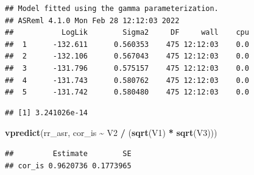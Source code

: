 \documentclass[
  12pt,
]{book}
\newenvironment{Shaded}{\begin{snugshade}}{\end{snugshade}}
\newcommand{\DataTypeTok}[1]{\textcolor[rgb]{0.13,0.29,0.53}{#1}}
\newcommand{\DecValTok}[1]{\textcolor[rgb]{0.00,0.00,0.81}{#1}}
\newcommand{\KeywordTok}[1]{\textcolor[rgb]{0.13,0.29,0.53}{\textbf{#1}}}
\newcommand{\NormalTok}[1]{#1}
\newcommand{\OperatorTok}[1]{\textcolor[rgb]{0.81,0.36,0.00}{\textbf{#1}}}
\newcommand{\OtherTok}[1]{\textcolor[rgb]{0.56,0.35,0.01}{#1}}
\newcommand{\StringTok}[1]{\textcolor[rgb]{0.31,0.60,0.02}{#1}}
\begin{document}
\begin{verbatim}
## Model fitted using the gamma parameterization.
## ASReml 4.1.0 Mon Feb 28 12:12:03 2022
##           LogLik        Sigma2     DF     wall    cpu
##  1      -132.611      0.560353    475 12:12:03    0.0
##  2      -132.106      0.567043    475 12:12:03    0.0
##  3      -131.796      0.575157    475 12:12:03    0.0
##  4      -131.743      0.580762    475 12:12:03    0.0
##  5      -131.742      0.580480    475 12:12:03    0.0
\end{verbatim}

\begin{Shaded}
\end{Shaded}

\begin{verbatim}
## [1] 3.241026e-14
\end{verbatim}

\begin{Shaded}
\begin{Highlighting}[]
\KeywordTok{vpredict}\NormalTok{(rr\_asr, cor\_is }\OperatorTok{\textasciitilde{}}\StringTok{ }\NormalTok{V2 }\OperatorTok{/}\StringTok{ }\NormalTok{(}\KeywordTok{sqrt}\NormalTok{(V1) }\OperatorTok{*}\StringTok{ }\KeywordTok{sqrt}\NormalTok{(V3)))}
\end{Highlighting}
\end{Shaded}

\begin{verbatim}
##         Estimate        SE
## cor_is 0.9620736 0.1773965
\end{verbatim}

\begin{Shaded}
\end{Shaded}
\end{document}
